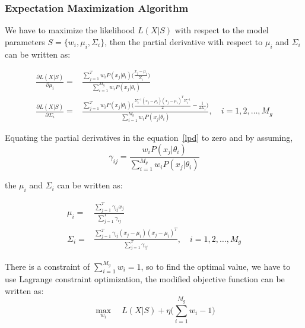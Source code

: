 \begin{spacing}{1.5}
\subsubsection{Expectation Maximization Algorithm}

We have to maximize the likelihood $L(X|S)$ with respect to the model parameters $S=\{w_{i},\mu_{i},\Sigma_{i}\}$, then the partial derivative with respect to $\mu_{i}$ and $\Sigma_{i}$ can be written as:

\begin{equation}
\begin{aligned}
\label{lpd}
 \frac{\partial L(X|S)}{\partial \mu_{i}}=&\frac{\sum_{j=1}^{T} w_{i}P(x_{j}|\theta_{i})\Big(\frac{x_{j}-\mu_{i}}{\Sigma_{i}}\Big)}{\sum_{i=1}^{M_{g}} w_{i}P(x_{j}|\theta_{i})}\\
 \frac{\partial L(X|S)}{\partial \Sigma_{i}}=&\frac{\sum_{j=1}^{T} w_{i}P(x_{j}|\theta_{i})\Big(\frac{\Sigma_{i}^{-1}(x_{j}-\mu_{i})(x_{j}-\mu_{i})^{T}\Sigma_{i}^{-1}}{2}-\frac{1}{2\Sigma_{i}}\Big)}{\sum_{i=1}^{M_{g}} w_{i}P(x_{j}|\theta_{i})}, \quad i=1,2,\ldots,M_{g}
 \end{aligned}
\end{equation}

Equating the partial derivatives in the equation~\ref{lpd} to zero and by assuming,
\begin{equation}
\label{gm}
    \gamma_{ij}=\frac{w_{i}P(x_{j}|\theta_{i})}{{\sum_{i=1}^{M_{g}} w_{i}P(x_{j}|\theta_{i})}}
\end{equation}

the $\mu_{i}$ and $\Sigma_{i}$ can be written as:

\begin{equation}
\begin{aligned}
\label{opmv}
\mu_{i}=&\frac{\sum_{j=1}^{T}\gamma_{ij}x_{j}}{\sum_{j=1}^{T}\gamma_{ij}}\\
\Sigma_{i}=&\frac{\sum_{j=1}^{T}\gamma_{ij}(x_{j}-\mu_{i})(x_{j}-\mu_{i})^{T}}{\sum_{j=1}^{T}\gamma_{ij}}, \quad i=1,2,\ldots,M_{g}
\end{aligned}
\end{equation}

%
There is a constraint of $\sum_{i=1}^{M_{g}}w_{i}=1$, so to find the optimal value, we have to use Lagrange constraint optimization, the modified objective function can be written as:
\begin{equation}
\label{obj}
    \max_{w_{i}} \quad L(X|S)+\eta \Bigg(\sum_{i=1}^{M_{g}}w_{i}-1 \Bigg)
\end{equation}


\end{spacing}
